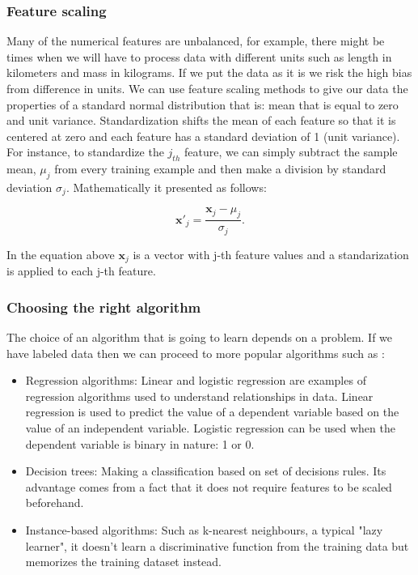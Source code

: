 \documentclass[a4paper,oneside,openright,11pt]{book}
\begin{document}
\subsubsection{Feature scaling}

Many of the numerical features are unbalanced, for example, there might be times when we will have to process data with different units such as length in kilometers and mass in kilograms. If we put the data as it is we risk the high bias from difference in units. We can use feature scaling methods to give our data the properties of a standard normal distribution that is: mean that is equal to zero and unit variance. Standardization shifts the mean of each feature so that it is centered at zero and each feature has a standard deviation of 1 (unit variance). For instance, to standardize the
$j_{th}$ feature, we can simply subtract the sample mean, $\mu_{j}$ from every training example and then make a division by standard deviation $\sigma_{j}$. Mathematically it presented as follows:


\begin{equation}
    \textbf{x}'_{j} = \frac{\textbf{x}_{j} - \mu_{j}}{\sigma_{j}}.
\end{equation}

In the equation above $\textbf{x}_j$ is a vector with j-th feature values and a standarization is applied to each j-th feature.

\subsubsection{Choosing the right algorithm}

The choice of an algorithm that is going to learn depends on a problem. If we have labeled data then we can proceed to more popular algorithms such as \cite{raschka}:

\begin{itemize}
    \item Regression algorithms: Linear and logistic regression are examples of regression algorithms used to understand relationships in data. Linear regression is used to predict the value of a dependent variable based on the value of an independent variable. Logistic regression can be used when the dependent variable is binary in nature: 1 or 0.
    \item Decision trees: Making a classification based on set of decisions rules. Its advantage comes from a fact that it does not require features to be scaled beforehand.
    \item Instance-based algorithms: Such as k-nearest neighbours, a typical "lazy learner", it doesn't learn a discriminative function from the training data but memorizes the training dataset instead.
\end{itemize}
\end{document}
